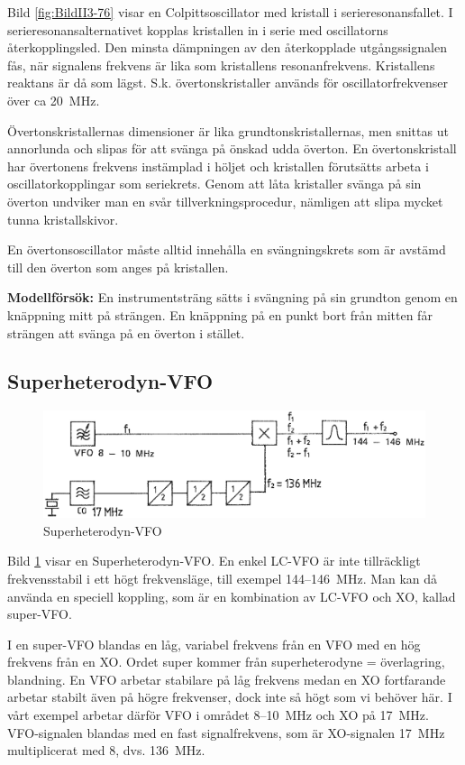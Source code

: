 Bild \ref{fig:BildII3-76} visar en Colpittsoscillator med kristall i
serieresonansfallet.
I serieresonansalternativet kopplas kristallen in i serie med
oscillatorns återkopplingsled.
Den minsta dämpningen av den återkopplade utgångssignalen fås, när signalens
frekvens är lika som kristallens resonanfrekvens.
Kristallens reaktans är då som lägst.
S.k. övertonskristaller används för oscillatorfrekvenser över ca 20~MHz.

Övertonskristallernas dimensioner är lika grundtonskristallernas, men
snittas ut annorlunda och slipas för att svänga på önskad udda överton.
En övertonskristall har övertonens frekvens instämplad i höljet och kristallen
förutsätts arbeta i oscillatorkopplingar som seriekrets.
Genom att låta kristaller svänga på sin överton undviker man en svår
tillverkningsprocedur, nämligen att slipa mycket tunna kristallskivor.

En övertonsoscillator måste alltid innehålla en svängningskrets som är
avstämd till den överton som anges på kristallen.

\textbf{Modellförsök:}
En instrumentsträng sätts i svängning på sin grundton genom en knäppning mitt
på strängen.
En knäppning på en punkt bort från mitten får strängen att svänga på en överton
i stället.

\subsection{Superheterodyn-VFO}

\begin{figure}
\includegraphics[width=\textwidth]{images/cropped_pdfs/bild_2_3-77.pdf}
\caption{Superheterodyn-VFO}
\label{fig:BildII3-77}
\end{figure}

Bild \ref{fig:BildII3-77} visar en Superheterodyn-VFO.
En enkel LC-VFO är inte tillräckligt frekvensstabil i ett högt frekvensläge,
till exempel 144--146~MHz.
Man kan då använda en speciell koppling, som är en kombination av LC-VFO och
XO, kallad super-VFO.

I en super-VFO blandas en låg, variabel frekvens från en VFO med en hög
frekvens från en XO.
Ordet super kommer från superheterodyne = överlagring, blandning.
En VFO arbetar stabilare på låg frekvens medan en XO fortfarande arbetar
stabilt även på högre frekvenser, dock inte så högt som vi behöver här.
I vårt exempel arbetar därför VFO i området 8--10~MHz och XO på 17~MHz.
VFO-signalen blandas med en fast signalfrekvens, som är XO-signalen 17~MHz
multiplicerat med 8, dvs. 136~MHz.

